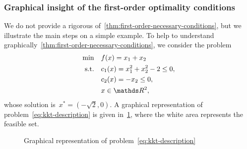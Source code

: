 \subsubsection{Graphical insight of the first-order optimality conditions}

We do not provide a rigorous of~\cref{thm:first-order-necessary-conditions}, but we illustrate the main steps on a simple example.
To help to understand graphically~\cref{thm:first-order-necessary-conditions}, we consider the problem
\begin{subequations}
    \label{eq:kkt-description}
    \begin{align}
        \min        & \quad \obj(x) = x_1 + x_2\\
        \text{s.t.} & \quad \con{1}(x) = x_1^2 + x_2^2 - 2 \le 0, \label{eq:kkt-description-c1}\\
                    & \quad \con{2}(x) = -x_2 \le 0, \label{eq:kkt-description-c2}\\
                    & \quad x \in \R^2, \nonumber
    \end{align}
\end{subequations}
whose solution is~$x^{\ast} = (-\sqrt{2}, 0)$.
A graphical representation of problem~\cref{eq:kkt-description} is given in~\cref{fig:kkt-description}, where the white area represents the feasible set.

\begin{figure}[ht]
    \centering
    \caption{Graphical representation of problem~\cref{eq:kkt-description}}
    \label{fig:kkt-description}
\end{figure}

